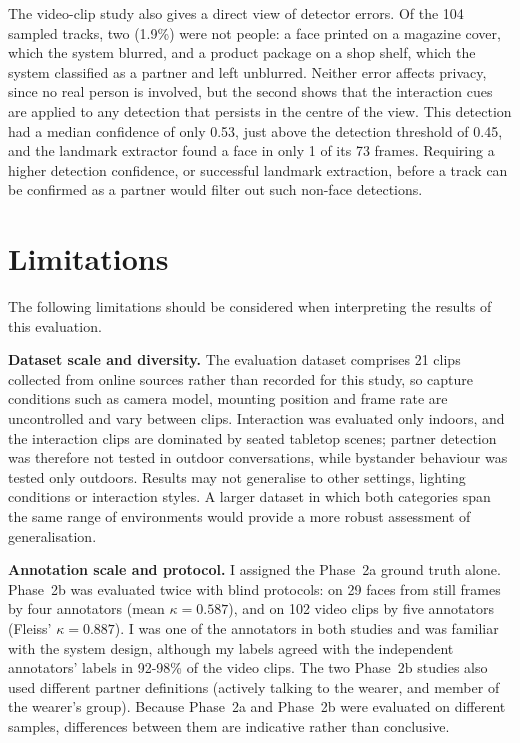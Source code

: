 The video-clip study also gives a direct view of detector errors. Of the 104
sampled tracks, two (1.9\%) were not people: a face printed on a magazine cover,
which the system blurred, and a product package on a shop shelf, which the system
classified as a partner and left unblurred. Neither error affects privacy, since no
real person is involved, but the second shows that the interaction cues are applied
to any detection that persists in the centre of the view. This detection had a
median confidence of only 0.53, just above the detection threshold of 0.45, and the
landmark extractor found a face in only 1 of its 73 frames. Requiring a higher
detection confidence, or successful landmark extraction, before a track can be
confirmed as a partner would filter out such non-face detections.

\section{Limitations}
\label{sec:disc_limitations}

The following limitations should be considered when interpreting the results of this
evaluation.

\textbf{Dataset scale and diversity.} The evaluation dataset comprises 21 clips
collected from online sources rather than recorded for this study, so capture
conditions such as camera model, mounting position and frame rate are uncontrolled
and vary between clips. Interaction was evaluated only indoors, and the interaction
clips are dominated by seated tabletop scenes; partner detection was therefore not
tested in outdoor conversations, while bystander behaviour was tested only outdoors.
Results may not generalise to other settings, lighting conditions or interaction
styles. A larger dataset in which both categories span the same range of
environments would provide a more robust assessment of generalisation.

\textbf{Annotation scale and protocol.} I assigned the Phase~2a ground truth
alone. Phase~2b was evaluated twice with blind protocols: on 29 faces from still
frames by four annotators (mean $\kappa = 0.587$), and on 102 video clips by five
annotators (Fleiss' $\kappa = 0.887$). I was one of the annotators in both studies
and was familiar with the system design, although my labels agreed with the
independent annotators' labels in 92-98\% of the video clips. The two Phase~2b
studies also used different partner definitions (actively talking to the wearer,
and member of the wearer's group). Because Phase~2a and Phase~2b were evaluated on
different samples, differences between them are indicative rather than conclusive.

